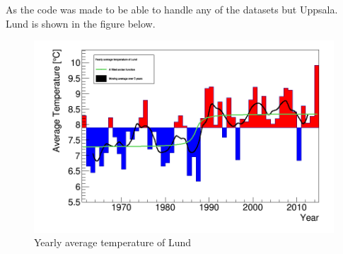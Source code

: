 As the code was made to be able to handle any of the datasets but Uppsala. Lund is shown in the figure below. 

	

\begin{figure}
    \centering
		\includegraphics[width=14cm]{yearAvg_Lund.png}
		\caption{Yearly average temperature of Lund}
		\label{Lund}
\end{figure}


